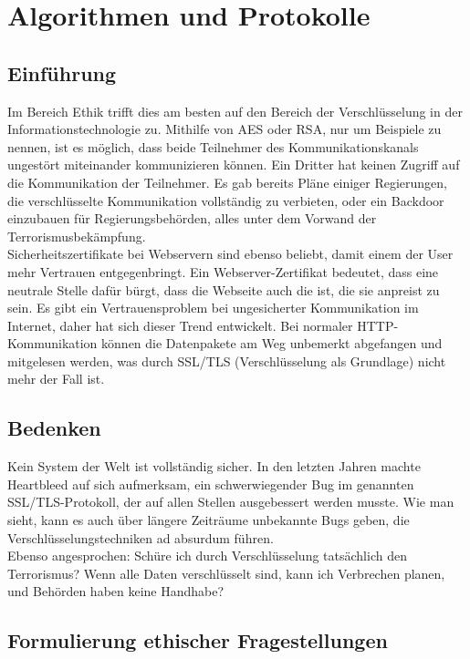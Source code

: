\documentclass[letterpaper, 12pt]{article}
\let\tempsection\section
\renewcommand\section[1]{\vspace{-0.3cm}\tempsection{#1}\vspace{-0.3cm}}
\let\tempsubsection\subsection
\renewcommand\subsection[1]{\vspace{0cm}\tempsubsection{#1}\vspace{0cm}}
\begin{document}
\clearpage

\section{Algorithmen und Protokolle}

\subsection{Einführung}

Im Bereich Ethik trifft dies am besten auf den Bereich der Verschlüsselung in der Informationstechnologie zu. Mithilfe von AES oder RSA, nur um Beispiele zu nennen, ist es möglich, dass beide Teilnehmer des Kommunikationskanals ungestört miteinander kommunizieren können. Ein Dritter hat keinen Zugriff auf die Kommunikation der Teilnehmer. Es gab bereits Pläne einiger Regierungen, die verschlüsselte Kommunikation vollständig zu verbieten, oder ein Backdoor einzubauen für Regierungsbehörden, alles unter dem Vorwand der Terrorismusbekämpfung. \\
Sicherheitszertifikate bei Webservern sind ebenso beliebt, damit einem der User mehr Vertrauen entgegenbringt. Ein Webserver-Zertifikat bedeutet, dass eine neutrale Stelle dafür bürgt, dass die Webseite auch die ist, die sie anpreist zu sein. Es gibt ein Vertrauensproblem bei ungesicherter Kommunikation im Internet, daher hat sich dieser Trend entwickelt. Bei normaler HTTP-Kommunikation können die Datenpakete am Weg unbemerkt abgefangen und mitgelesen werden, was durch SSL/TLS (Verschlüsselung als Grundlage) nicht mehr der Fall ist. \cite{cam}

\subsection{Bedenken}

Kein System der Welt ist vollständig sicher. In den letzten Jahren machte Heartbleed auf sich aufmerksam, ein schwerwiegender Bug im genannten SSL/TLS-Protokoll, der auf allen Stellen ausgebessert werden musste. Wie man sieht, kann es auch über längere Zeiträume unbekannte Bugs geben, die Verschlüsselungstechniken ad absurdum führen. \\
Ebenso angesprochen: Schüre ich durch Verschlüsselung tatsächlich den Terrorismus? Wenn alle Daten verschlüsselt sind, kann ich Verbrechen planen, und Behörden haben keine Handhabe? \cite{hb}

\subsection{Formulierung ethischer Fragestellungen}
\end{document}
